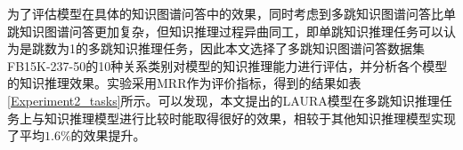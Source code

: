\documentclass[algorithmlist, AutoFakeBold, AutoFakeSlant, figurelist, tablelist, nomlist, engineering]{seuthesix}
\begin{document}


为了评估模型在具体的知识图谱问答中的效果，同时考虑到多跳知识图谱问答比单跳知识图谱问答更加复杂，但知识推理过程异曲同工，即单跳知识推理任务可以认为是跳数为1的多跳知识推理任务，因此本文选择了多跳知识图谱问答数据集FB15K-237-50的10种关系类别对模型的知识推理能力进行评估，并分析各个模型的知识推理效果。实验采用MRR作为评价指标，得到的结果如表\ref{Experiment2_tasks}所示。可以发现，本文提出的LAURA模型在多跳知识推理任务上与知识推理模型进行比较时能取得很好的效果，相较于其他知识推理模型实现了平均$1.6\%$的效果提升。
\end{document}
